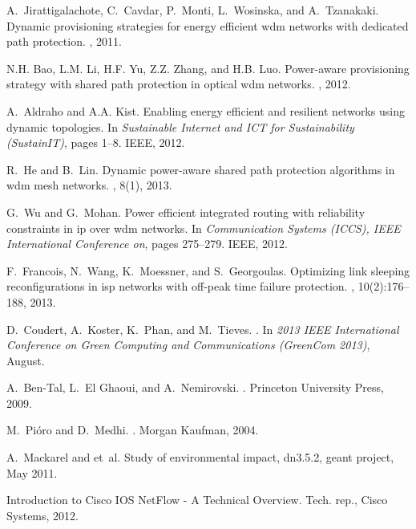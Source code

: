 \documentclass[final,5p,times,twocolumn]{elsarticle}
\begin{document}
\begin{thebibliography}{10}
A.~Jirattigalachote, C.~Cavdar, P.~Monti, L.~Wosinska, and A.~Tzanakaki.
\newblock Dynamic provisioning strategies for energy efficient wdm networks
  with dedicated path protection.
, 2011.

N.H. Bao, L.M. Li, H.F. Yu, Z.Z. Zhang, and H.B. Luo.
\newblock Power-aware provisioning strategy with shared path protection in
  optical wdm networks.
, 2012.

A.~Aldraho and A.A. Kist.
\newblock Enabling energy efficient and resilient networks using dynamic
  topologies.
\newblock In {\em Sustainable Internet and ICT for Sustainability (SustainIT)},
  pages 1--8. IEEE, 2012.

R.~He and B.~Lin.
\newblock Dynamic power-aware shared path protection algorithms in wdm mesh
  networks.
, 8(1), 2013.

G.~Wu and G.~Mohan.
\newblock Power efficient integrated routing with reliability constraints in ip
  over wdm networks.
\newblock In {\em Communication Systems (ICCS), IEEE International Conference
  on}, pages 275--279. IEEE, 2012.

F.~Francois, N.~Wang, K.~Moessner, and S.~Georgoulas.
\newblock Optimizing link sleeping reconfigurations in isp networks with
  off-peak time failure protection.
,
  10(2):176--188, 2013.

D.~Coudert, A.~Koster, K.~Phan, and M.~Tieves.
.
\newblock In {\em {2013 IEEE International Conference on Green Computing and
  Communications (GreenCom 2013)}}, August.

A.~Ben-Tal, L.~El Ghaoui, and A.~Nemirovski.
.
\newblock Princeton University Press, 2009.

M.~Pi\'oro and D.~Medhi.
.
\newblock Morgan Kaufman, 2004.

A.~Mackarel and et~al.
\newblock Study of environmental impact, dn3.5.2, geant project, May 2011.

{Introduction to Cisco IOS NetFlow - A Technical Overview}.
\newblock Tech. rep., Cisco Systems, 2012.


\end{thebibliography}
\end{document}
